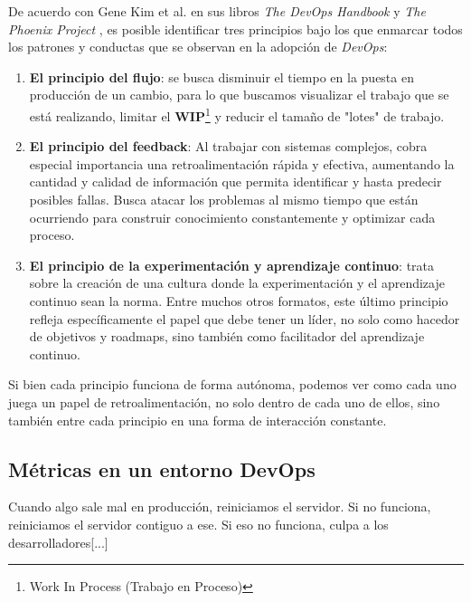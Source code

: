 \documentclass[journal]{IEEEtran}
\begin{document}
De acuerdo con Gene Kim et al. en sus libros \textit{The DevOps Handbook} \cite{kim2021devops} y \textit{The Phoenix Project} \cite{kim2018phoenix}, es posible identificar tres principios bajo los que enmarcar todos los patrones y conductas que se observan en la adopción de \textit{DevOps}:
\begin{enumerate}
    \item \textbf{El principio del flujo}\cite[Part 1.2: The First Way: The Principles of Flow]{kim2021devops}: se busca disminuir el tiempo en la puesta en producción de un cambio, para lo que buscamos visualizar el trabajo que se está realizando, limitar el \textbf{WIP}\footnote{Work In Process (Trabajo en Proceso)} y reducir el tamaño de "lotes" de trabajo.
    \item \textbf{El principio del feedback}\cite[Part 1.3: The Second Way: The Principles of Feedback]{kim2021devops}: Al trabajar con sistemas complejos, cobra especial importancia una retroalimentación rápida y efectiva, aumentando la cantidad y calidad de información que permita identificar y hasta predecir posibles fallas. Busca atacar los problemas al mismo tiempo que están ocurriendo para construir conocimiento constantemente y optimizar cada proceso.
    \item \textbf{El principio de la experimentación y aprendizaje continuo}\cite[Part 1.4: The Third Way: The Principles of Continual Learning and Experimentation]{kim2021devops}: trata sobre la creación de una cultura donde la experimentación y el aprendizaje continuo sean la norma. Entre muchos otros formatos, este último principio refleja específicamente el papel que debe tener un líder, no solo como hacedor de objetivos y roadmaps, sino también como facilitador del aprendizaje continuo.
\end{enumerate}

Si bien cada principio funciona de forma autónoma, podemos ver como cada uno juega un papel de retroalimentación, no solo dentro de cada uno de ellos, sino también entre cada principio en una forma de interacción constante. 

\subsection{\textbf{Métricas en un entorno DevOps}}

\begin{tcolorbox}[colback=gray!10, colframe=black, left=2mm, right=2mm]
    \small %
    \ttfamily %
    \raggedright %
    Cuando algo sale mal en producción, reiniciamos el servidor. Si no funciona, reiniciamos el servidor contiguo a ese. Si eso no funciona, culpa a los desarrolladores[...] \cite{kim2021devops}
\end{tcolorbox}
\end{document}

